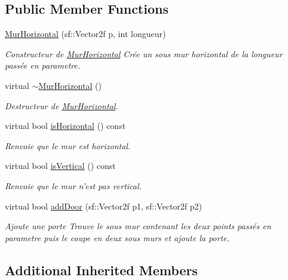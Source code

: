\subsection*{Public Member Functions}
\begin{DoxyCompactItemize}
\item 
\hyperlink{classMurHorizontal_a04afad18c785afa55372ae5a75724819}{Mur\-Horizontal} (sf\-::\-Vector2f p, int longueur)
\begin{DoxyCompactList}\small\item\em Constructeur de \hyperlink{classMurHorizontal}{Mur\-Horizontal} Crée un sous mur horizontal de la longueur passée en parametre. \end{DoxyCompactList}\item 
\hypertarget{classMurHorizontal_afaaf65d3033a527556f70c20371fa303}{virtual \hyperlink{classMurHorizontal_afaaf65d3033a527556f70c20371fa303}{$\sim$\-Mur\-Horizontal} ()}\label{classMurHorizontal_afaaf65d3033a527556f70c20371fa303}

\begin{DoxyCompactList}\small\item\em Destructeur de \hyperlink{classMurHorizontal}{Mur\-Horizontal}. \end{DoxyCompactList}\item 
virtual bool \hyperlink{classMurHorizontal_a848a423ad763fbb5bc9103ac78187181}{is\-Horizontal} () const 
\begin{DoxyCompactList}\small\item\em Renvoie que le mur est horizontal. \end{DoxyCompactList}\item 
virtual bool \hyperlink{classMurHorizontal_a3549eac83fd0fe73ae47314fb88b81f4}{is\-Vertical} () const 
\begin{DoxyCompactList}\small\item\em Renvoie que le mur n'est pas vertical. \end{DoxyCompactList}\item 
virtual bool \hyperlink{classMurHorizontal_a59c0b82257b1f7d83397bde217c2636d}{add\-Door} (sf\-::\-Vector2f p1, sf\-::\-Vector2f p2)
\begin{DoxyCompactList}\small\item\em Ajoute une porte Trouve le sous mur contenant les deux points passés en parametre puis le coupe en deux sous murs et ajoute la porte. \end{DoxyCompactList}\end{DoxyCompactItemize}
\subsection*{Additional Inherited Members}


